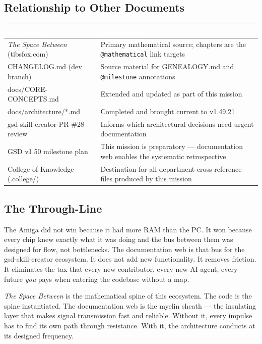 \documentclass[11pt,letterpaper]{article}
\newcommand{\tableheader}[1]{\textbf{\sffamily\textcolor{white}{#1}}}
\begin{document}
\subsection{Relationship to Other Documents}

\begin{center}
\begin{tabularx}{\textwidth}{L{4cm}X}
\toprule
{}
\tableheader{Document} & \tableheader{Relationship} \\
\midrule
\textit{The Space Between} (tibsfox.com) & Primary mathematical source; chapters are the \texttt{@mathematical} link targets \\
CHANGELOG.md (dev branch) & Source material for GENEALOGY.md and \texttt{@milestone} annotations \\
docs/CORE-CONCEPTS.md & Extended and updated as part of this mission \\
docs/architecture/*.md & Completed and brought current to v1.49.21 \\
gsd-skill-creator PR \#28 review & Informs which architectural decisions need urgent documentation \\
GSD v1.50 milestone plan & This mission is preparatory --- documentation web enables the systematic retrospective \\
College of Knowledge (.college/) & Destination for all department cross-reference files produced by this mission \\
\bottomrule
\end{tabularx}
\end{center}

\subsection{The Through-Line}

The Amiga did not win because it had more RAM than the PC. It won because every chip knew exactly what it was doing and the bus between them was designed for flow, not bottlenecks. The documentation web is that bus for the gsd-skill-creator ecosystem. It does not add new functionality. It removes friction. It eliminates the tax that every new contributor, every new AI agent, every future \textit{you} pays when entering the codebase without a map.

\textit{The Space Between} is the mathematical spine of this ecosystem. The code is the spine instantiated. The documentation web is the myelin sheath --- the insulating layer that makes signal transmission fast and reliable. Without it, every impulse has to find its own path through resistance. With it, the architecture conducts at its designed frequency.
\end{document}
